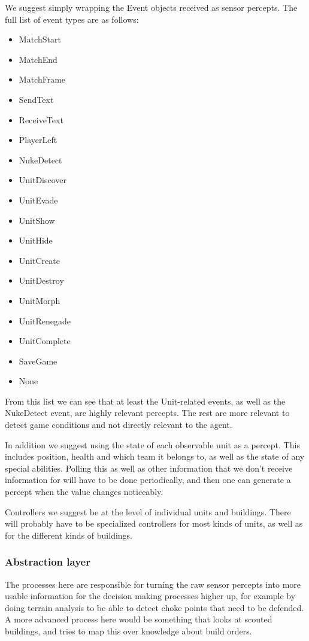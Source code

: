 We suggest simply wrapping the Event objects received as sensor percepts. The
full list of event types are as follows:
\begin{multicols}{2}
\begin{itemize}
    \item MatchStart
    \item MatchEnd
    \item MatchFrame
    \item SendText
    \item ReceiveText
    \item PlayerLeft
    \item NukeDetect
    \item UnitDiscover
    \item UnitEvade
    \item UnitShow
    \item UnitHide
    \item UnitCreate
    \item UnitDestroy
    \item UnitMorph
    \item UnitRenegade
    \item UnitComplete
    \item SaveGame
    \item None 
\end{itemize}
\end{multicols}
From this list we can see that at least the Unit-related events, as well as the
NukeDetect event, are highly relevant percepts. The rest are more relevant to
detect game conditions and not directly relevant to the agent.

In addition we suggest using the state of each observable unit as a percept.
This includes position, health and which team it belongs to, as well as the
state of any special abilities. Polling this as well as other information that
we don't receive information for will have to be done periodically, and then
one can generate a percept when the value changes noticeably.

Controllers we suggest be at the level of individual units and buildings. There
will probably have to be specialized controllers for most kinds of units, as
well as for the different kinds of buildings.

\subsubsection{Abstraction layer}
The processes here are responsible for turning the raw sensor percepts into
more usable information for the decision making processes higher up, for
example by doing terrain analysis to be able to detect choke points that need
to be defended. A more advanced process here would be something that looks at
scouted buildings, and tries to map this over knowledge about build orders.

